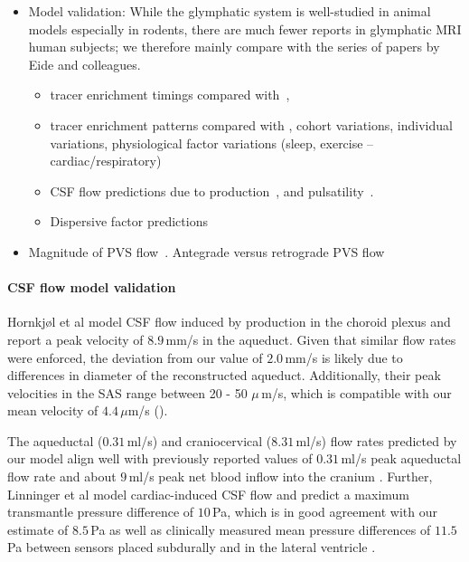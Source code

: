 \documentclass[fleqn,10pt]{wlscirep}
\newcommand{\draft}[1]{\textcolor{gray}{#1}}
\begin{document}
\begin{itemize}
\item
  Model validation: While the glymphatic system is well-studied in
  animal models especially in rodents, there are much fewer reports in
  glymphatic MRI human subjects; we therefore mainly compare with the
  series of papers by Eide and colleagues.
  \begin{itemize}
  \item
    tracer enrichment timings compared with~\cite{eide2024functional,
      yamamoto2024perivascular},
  \item tracer enrichment patterns compared with
    \cite{ringstad2017brain, ringstad2018brain, ringstad2021sleep},
    cohort variations, individual variations, physiological factor
    variations (sleep, exercise -- cardiac/respiratory)
  \item
    CSF flow predictions due to production~\cite{hornkjol2022csf}, and
    pulsatility~\cite{vinje2019respiratory, baledent2014imaging, linninger2007cerebrospinal}.
  \item
    Dispersive factor predictions~\cite{sharp2019dispersion, ray2021quantitative}
  \end{itemize}
\item
  Magnitude of PVS flow~\cite{mestre2018flow,
    bedussi2018paravascular}. Antegrade versus retrograde PVS flow
\end{itemize}

\draft{\lipsum[1-5]}

\iffalse
\paragraph{CSF flow model validation}

Hornkjøl et al \cite{hornkjol2022csf} model CSF flow induced by production in the choroid plexus and report a peak velocity of $8.9\,$mm/s in the aqueduct. Given that similar flow rates were enforced, the deviation from our value of $2.0\,$mm/s is likely due to differences in diameter of the reconstructed aqueduct. Additionally, their peak velocities in the SAS range between 20 - 50 $\mu\,$m/s, which is compatible with our mean velocity of $4.4\,\mu$m/s ().

The aqueductal ($0.31\,$ml/s) and craniocervical ($8.31\,$ml/s) flow rates predicted by our model align well with previously reported values of $0.31\,$ml/s peak aqueductal flow rate \cite{vinje2019respiratory} and about $9\,$ml/s peak net blood inflow into the cranium \cite{baledent2014imaging}. Further, Linninger et al \cite{linninger2007cerebrospinal} model cardiac-induced CSF flow and predict a maximum transmantle pressure difference of $10\,$Pa, which is in good agreement with our estimate of $8.5\,$Pa as well as clinically measured mean pressure differences of $11.5\,$Pa between sensors placed subdurally and in the lateral ventricle \cite{vinje2019respiratory}.
\end{document}
